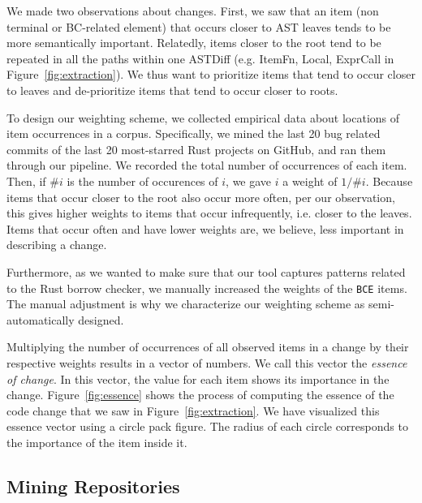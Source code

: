 We made two observations about changes. First, we saw that an item (non terminal or BC-related element) that occurs closer to AST leaves tends to be more semantically important. Relatedly, items closer to the root tend to be repeated in all the paths within one ASTDiff (e.g. ItemFn, Local, ExprCall in Figure~\ref{fig:extraction}). We thus want to prioritize items that tend to occur closer to leaves and de-prioritize items that tend to occur closer to roots.

To design our weighting scheme, we collected empirical data about locations of item occurrences in a corpus. Specifically, we mined the last 20 bug related commits of the last 20 most-starred Rust projects on GitHub, and ran them through our pipeline. We recorded the total number of occurrences of each item. Then, if $\# i$ is the number of occurences of $i$, we gave $i$ a weight of $1/\# i$. Because items that occur closer to the root also occur more often, per our observation, this gives higher weights to items that occur infrequently, i.e. closer to the leaves. Items that occur often and have lower weights are, we believe, less important in describing a change.

Furthermore, as we wanted to make sure that our tool captures patterns related to the Rust borrow checker, we manually increased the weights of the \texttt{BCE} items. The manual adjustment is why we characterize our weighting scheme as semi-automatically designed. 

Multiplying the number of occurrences of all observed items in a change by their respective weights results in a vector of numbers. We call this vector the \emph{essence of change}. In this vector, the value for each item shows its importance in the change. Figure~\ref{fig:essence} shows the process of computing the essence of the code change that we saw in Figure~\ref{fig:extraction}. We have visualized this essence vector using a circle pack figure. The radius of each circle corresponds to the importance of the item inside it.

\subsection{\label{sec:mining_repositories}Mining Repositories}
\label{sec:mining}


